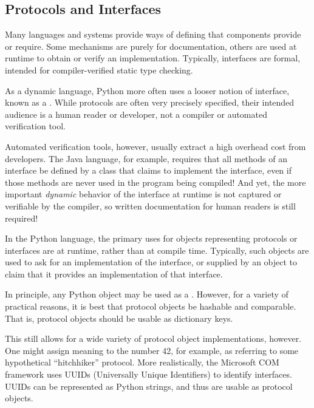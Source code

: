 \subsection{Protocols and Interfaces \label{protocol-concepts}}

Many languages and systems provide ways of defining  that
components provide or require.  Some mechanisms are purely for documentation,
others are used at runtime to obtain or verify an implementation.  Typically,
interfaces are formal, intended for compiler-verified static type checking.

As a dynamic language, Python more often uses a looser notion of interface,
known as a .  While protocols are often very precisely
specified, their intended audience is a human reader or developer, not a
compiler or automated verification tool.

Automated verification tools, however, usually extract a high overhead cost
from developers.  The Java language, for example, requires that all methods
of an interface be defined by a class that claims to implement the
interface, even if those methods are never used in the program being
compiled!  And yet, the more important \emph{dynamic} behavior of the
interface at runtime is not captured or verifiable by the compiler, so written
documentation for human readers is still required!

In the Python language, the primary uses for objects representing protocols
or interfaces are at runtime, rather than at compile time.  Typically, such
objects are used to ask for an implementation of the interface, or supplied
by an object to claim that it provides an implementation of that interface.

In principle, any Python object may be used as a .
However, for a variety of practical reasons, it is best that protocol objects
be hashable and comparable.  That is, protocol objects should be usable as
dictionary keys.

This still allows for a wide variety of protocol object implementations,
however.  One might assign meaning to the number 42, for example, as
referring to some hypothetical ``hitchhiker'' protocol.  More realistically,
the Microsoft COM framework uses UUIDs (Universally Unique Identifiers) to
identify interfaces.  UUIDs can be represented as Python strings, and thus
are usable as protocol objects.





